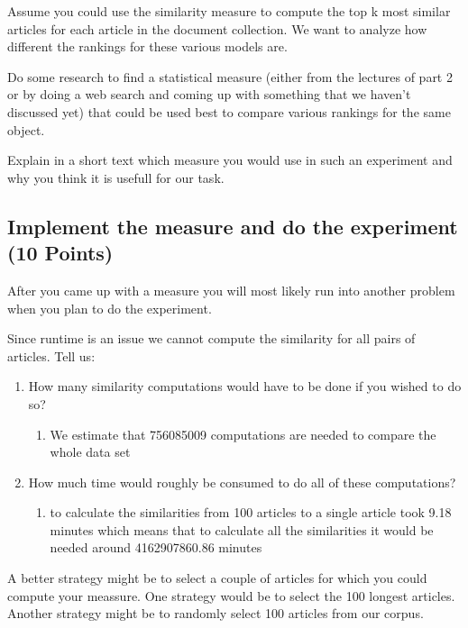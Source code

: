 \documentclass{WeSTassignment}
\begin{document}
Assume you could use the similarity measure to compute the top k most similar articles for each article in the document collection. We want to analyze how different the rankings for these various models are. 

Do some research to find a statistical measure (either from the lectures of part 2 or by doing a web search and coming up with something that we haven't discussed yet) that could be used best to compare various rankings for the same object. 

Explain in a short text which measure you would use in such an experiment and why you think it is usefull for our task. 

\subsection{Implement the measure and do the experiment (10 Points)}
After you came up with a measure you will most likely run into another problem when you plan to do the experiment. 

Since runtime is an issue we cannot compute the similarity for all pairs of articles. Tell us: 
\begin{enumerate}
\item How many similarity computations would have to be done if you wished to do so? 
\begin{enumerate}
\item We estimate that 756085009 computations are needed to compare the whole data set
\end{enumerate}
\item How much time would roughly be consumed to do all of these computations?
\begin{enumerate}
\item to calculate the similarities from 100 articles to a single article took 9.18 minutes which means that to calculate all the similarities it would be needed around 4162907860.86 minutes
\end{enumerate}
\end{enumerate}

A better strategy might be to select a couple of articles for which you could compute your meassure. One strategy would be to select the 100 longest articles. Another strategy might be to randomly select 100 articles from our corpus. 
\end{document}
